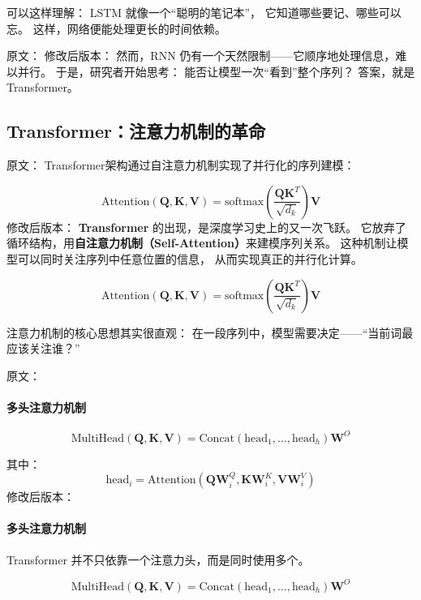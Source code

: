 可以这样理解：  
LSTM 就像一个“聪明的笔记本”，  
它知道哪些要记、哪些可以忘。  
这样，网络便能处理更长的时间依赖。



原文：
修改后版本：
然而，RNN 仍有一个天然限制——它顺序地处理信息，难以并行。  
于是，研究者开始思考：  
能否让模型一次“看到”整个序列？  
答案，就是Transformer。

\subsection{Transformer：注意力机制的革命}

原文：
Transformer架构通过自注意力机制实现了并行化的序列建模：

$$\text{Attention}(\mathbf{Q}, \mathbf{K}, \mathbf{V}) = \text{softmax}\left(\frac{\mathbf{Q}\mathbf{K}^T}{\sqrt{d_k}}\right)\mathbf{V}$$
修改后版本：
\textbf{Transformer} 的出现，是深度学习史上的又一次飞跃。  
它放弃了循环结构，用\textbf{自注意力机制（Self-Attention）}来建模序列关系。  
这种机制让模型可以同时关注序列中任意位置的信息，  
从而实现真正的并行化计算。

$$\text{Attention}(\mathbf{Q}, \mathbf{K}, \mathbf{V}) = \text{softmax}\left(\frac{\mathbf{Q}\mathbf{K}^T}{\sqrt{d_k}}\right)\mathbf{V}$$

注意力机制的核心思想其实很直观：  
在一段序列中，模型需要决定——“当前词最应该关注谁？”



原文：
\paragraph{多头注意力机制}
$$\text{MultiHead}(\mathbf{Q}, \mathbf{K}, \mathbf{V}) = \text{Concat}(\text{head}_1, \ldots, \text{head}_h)\mathbf{W}^O$$

其中：
$$\text{head}_i = \text{Attention}(\mathbf{Q}\mathbf{W}_i^Q, \mathbf{K}\mathbf{W}_i^K, \mathbf{V}\mathbf{W}_i^V)$$
修改后版本：
\paragraph{多头注意力机制}  
Transformer 并不只依靠一个注意力头，而是同时使用多个。  

$$\text{MultiHead}(\mathbf{Q}, \mathbf{K}, \mathbf{V}) = \text{Concat}(\text{head}_1, \ldots, \text{head}_h)\mathbf{W}^O$$

